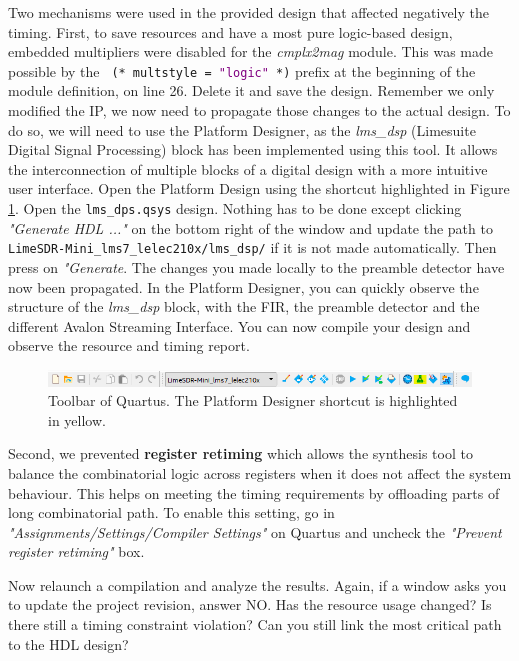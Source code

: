 Two mechanisms were used in the provided design that affected negatively the timing. First, to save resources and have a most pure logic-based design, embedded multipliers were disabled for the \textit{cmplx2mag} module. This was made possible by the \texttt{ (* multstyle = \textcolor{purple}{"logic"} *)} prefix at the beginning of the module definition, on line 26. Delete it and save the design. Remember we only modified the IP, we now need to propagate those changes to the actual design. To do so, we will need to use the Platform Designer, as the \textit{lms\_dsp} (Limesuite Digital Signal Processing) block has been implemented using this tool. It allows the interconnection of multiple blocks of a digital design with a more intuitive user interface. Open the Platform Design using the shortcut highlighted in Figure \ref{fig:quartus_platform_designer}. Open the \texttt{lms\_dps.qsys} design. Nothing has to be done except clicking \textit{"Generate HDL ..."} on the bottom right of the window and update the path to
\texttt{LimeSDR-Mini\_lms7\_lelec210x/lms\_dsp/} if it is not made automatically. Then press on \textit{"Generate}. The changes you made locally to the preamble detector have now been propagated. In the Platform Designer, you can quickly observe the structure of the \textit{lms\_dsp} block, with the FIR, the preamble detector and the different Avalon Streaming Interface. You can now compile your design and observe the resource and timing report.

\begin{figure}[H]
    \centering
    \includegraphics[scale=0.7]{figures/quartus_toolbar.PNG}
    \caption{Toolbar of Quartus. The Platform Designer shortcut is highlighted in yellow.}
    \label{fig:quartus_platform_designer}
\end{figure}

Second, we prevented \textbf{register retiming} which allows the synthesis tool to balance the combinatorial logic across registers when it does not affect the system behaviour. This helps on meeting the timing requirements by offloading parts of long combinatorial path. To enable this setting, go in \textit{"Assignments/Settings/Compiler Settings"} on Quartus and uncheck the \textit{"Prevent register retiming"} box. 

Now relaunch a compilation and analyze the results. Again, if a window asks you to update the project revision, answer NO.  Has the resource usage changed? Is there still a timing constraint violation? Can you still link the most critical path to the HDL design? 


